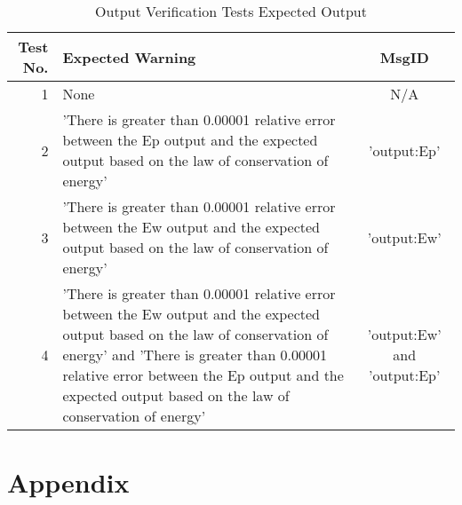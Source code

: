 \documentclass[12pt]{article}
\begin{document}
\begin{center}
	\begin{longtable}{ | r | p{9cm} | c |}
		\caption{Output Verification Tests Expected Output} \\ \hline \label{TblOutVerifyOut} 
		Test No. & Expected Warning & MsgID \\ \hline
		1 &  None & N/A \\ \hline
		2 &  'There is greater than 0.00001 relative error between the Ep output and the expected output based on the law of conservation of energy' & 'output:Ep' \\ \hline
		3 &  'There is greater than 0.00001 relative error between the Ew output and the expected output based on the law of conservation of energy' & 'output:Ew'\\ \hline
		4 &  'There is greater than 0.00001 relative error between the Ew output and the expected output based on the law of conservation of energy' and 'There is greater than 0.00001 relative error between the Ep output and the expected output based on the law of conservation of energy' & 'output:Ew' and 'output:Ep'\\ \hline
	\end{longtable}
\end{center}

\section{Appendix}
\end{document}

